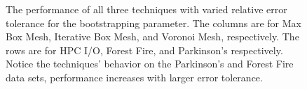 \begin{figure}
  \caption{The performance of all three techniques with varied relative error tolerance for the bootstrapping parameter. The columns are for Max Box Mesh, Iterative Box Mesh, and Voronoi Mesh, respectively. The rows are for HPC I/O, Forest Fire, and Parkinson's respectively. Notice the techniques' behavior on the Parkinson's and Forest Fire data sets, performance increases with larger error tolerance.}
  \label{fig_all_performance}
\end{figure}

